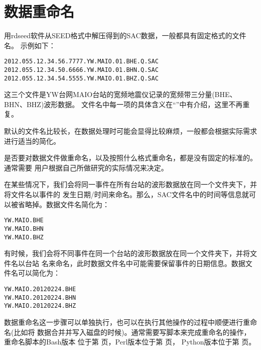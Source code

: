\section{数据重命名}
用rdseed软件从SEED格式中解压得到的SAC数据，一般都具有固定格式的文件名。
示例如下：
\begin{verbatim}
2012.055.12.34.56.7777.YW.MAIO.01.BHE.Q.SAC
2012.055.12.34.50.6666.YW.MAIO.01.BHN.Q.SAC
2012.055.12.34.54.5555.YW.MAIO.01.BHZ.Q.SAC
\end{verbatim}
这三个文件是YW台网MAIO台站的宽频地震仪记录的宽频带三分量(BHE、BHN、BHZ)波形数据。
文件名中每一项的具体含义在``''中有介绍，这里不再重复。

默认的文件名比较长，在数据处理时可能会显得比较麻烦，一般都会根据实际需求进行适当的简化。

是否要对数据文件做重命名，以及按照什么格式重命名，都是没有固定的标准的。通常需要
用户根据自己所做研究的实际情况来决定。

在某些情况下，我们会将同一事件在所有台站的波形数据放在同一个文件夹下，并将文件名以事件的
发生日期/时间来命名。那么，SAC文件名中的时间等信息就可以被省略掉。数据文件名简化为：
\begin{verbatim}
YW.MAIO.BHE
YW.MAIO.BHN
YW.MAIO.BHZ
\end{verbatim}

有时候，我们会将不同事件在同一个台站的波形数据放在同一个文件夹下，并将文件名以台站
名来命名，此时数据文件名中可能需要保留事件的日期信息。数据文件名可以简化为：
\begin{verbatim}
YW.MAIO.20120224.BHE
YW.MAIO.20120224.BHN
YW.MAIO.20120224.BHZ
\end{verbatim}

数据重命名这一步骤可以单独执行，也可以在执行其他操作的过程中顺便进行重命名(比如将
数据合并并写入磁盘的时候)。通常需要写脚本来完成重命名的操作，重命名脚本的Bash版本
位于第 \pageref{subsec:rename-in-bash} 页，Perl版本位于第 \pageref{subsec:rename-in-perl} 页，
Python版本位于第 \pageref{subsec:rename-in-python} 页。
